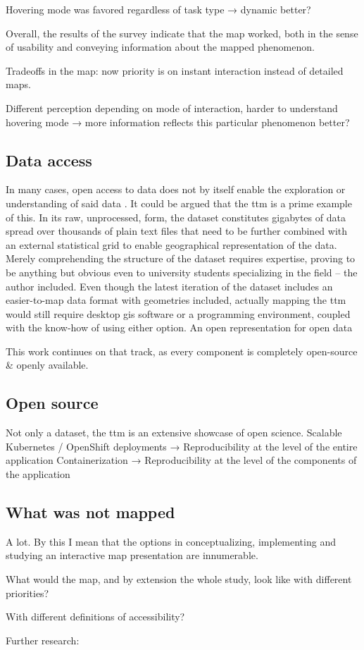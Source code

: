 Hovering mode was favored regardless of task type → dynamic better?

Overall, the results of the survey indicate that the map worked,
both in the sense of usability and conveying information about the mapped phenomenon.

Tradeoffs in the map:
now priority is on instant interaction instead of detailed maps.

Different perception depending on mode of interaction,
harder to understand hovering mode →
more information reflects this particular phenomenon better?


\subsection{Data access}


In many cases, open access to data does not by itself enable
the exploration or understanding of said data \parencite{obr2016}.
It could be argued that the \acrshort{ttm} is a prime example of this.
In its raw, unprocessed, form,
the dataset constitutes gigabytes of data spread over thousands of plain text files
that need to be further combined with an external statistical grid to enable
geographical representation of the data.
Merely comprehending the structure of the dataset requires expertise,
proving to be anything but obvious even to university students specializing in the field
-- the author included.
Even though the latest iteration of the dataset \parencite{fin2023}
includes an easier-to-map data format with geometries included,
actually mapping the \acrshort{ttm} would still require
desktop \acrshort{gis} software or a programming environment,
coupled with the know-how of using either option.
An open representation for open data

This work continues on that track,
as every component is completely open-source \& openly available.

\subsection{Open source}
Not only a dataset, the \acrshort{ttm} is an extensive showcase of open science.
Scalable Kubernetes / OpenShift deployments → Reproducibility at the level of the entire application
Containerization → Reproducibility at the level of the components of the application

\subsection{What was not mapped}

A lot. By this I mean that the options in
conceptualizing, implementing and studying an interactive map presentation are innumerable.

What would the map, and by extension the whole study, look like with different priorities?

With different definitions of accessibility?

Further research:
